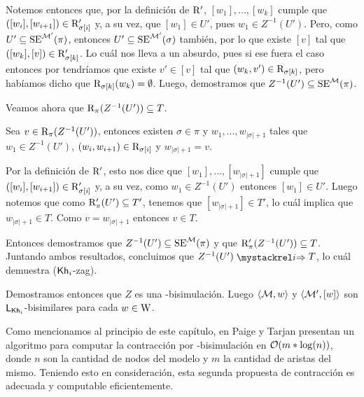 \begin{demostracion}
\begin{itemize}
        Notemos entonces que, por la definición de $\mathrm{R}'$, $[w_1],...,[w_k]$ cumple que $([w_i],[w_{i+1}]) \in \mathrm{R}'_{\sigma[i]}$ y, a su vez, 
        que $[w_1] \in U'$, pues $w_1 \in Z^{-1}(U')$. Pero, como $U'\subseteq\mathrm{SE}^{\mathcal{M}'}(\pi)$, entonces $U'\subseteq\mathrm{SE}^{\mathcal{M}'}(\sigma)$ 
        también, por lo que existe $[v]$ tal que $([w_k],[v]) \in \mathrm{R}'_{\sigma[k]}$. 
        Lo cuál nos lleva a un absurdo, pues si ese fuera el caso entonces por  tendríamos que existe 
        $v' \in [v]$ tal que $(w_k,v') \in \mathrm{R}_{\sigma[k]}$, pero habíamos dicho que $\mathrm{R}_{\sigma[k]}(w_k) = \emptyset$.
        Luego, demostramos que $Z^{-1}(U')\subseteq\mathrm{SE}^{\mathcal{M}}(\pi)$.

        Veamos ahora que $\mathrm{R}_\pi(Z^{-1}(U')) \subseteq T$.

        Sea $v \in \mathrm{R}_\pi(Z^{-1}(U'))$, entonces existen $\sigma \in \pi$ y $w_1,...,w_{|\sigma|+1}$ tales que 
        $w_1 \in Z^{-1}(U')$, $(w_i,w_{i+1}) \in \mathrm{R}_{\sigma[i]}$ y $w_{|\sigma|+1} = v$. 

        Por la definición de $\mathrm{R}'$, esto nos dice que $[w_1],...,[w_{|\sigma|+1}]$ cumple que $([w_i],[w_{i+1}]) \in \mathrm{R}'_{\sigma[i]}$ 
        y, a su vez, como $w_1 \in Z^{-1}(U')$ entonces $[w_1] \in U'$. Luego notemos que como $\mathrm{R}'_\pi(U') \subseteq T'$, tenemos que 
        $[w_{|\sigma|+1}] \in T'$, lo cuál implica que $w_{|\sigma|+1} \in T$. Como $v = w_{|\sigma|+1}$ entonces $v \in T$. 

        Entonces demostramos que $Z^{-1}(U')\subseteq\mathrm{SE}^{\mathcal{M}}(\pi)$ y que $\mathrm{R}'_\pi(Z^{-1}(U')) \subseteq T$. 
        Juntando ambos resultados, concluimos que $Z^{-1}(U') \ultsExecAgi T$, lo cuál demuestra ($\mathsf{Kh}_i$-zag).
    \end{itemize}
    Demostramos entonces que $Z$ es una \KHilogic-bisimulación. Luego $\langle \mathcal{M},w \rangle$ y $\langle \mathcal{M}',[w] \rangle$ son $\mathsf{L}_{\mathsf{Kh}_i}$-bisimilares 
    para cada $w \in \mathrm{W}$.
\end{demostracion}

Como mencionamos al principio de este capítulo, en \cite{Paige&TarjanContraction} 
Paige y Tarjan presentan un algoritmo para computar la contracción por \bml-bisimulación en $\mathcal{O}(m*\log(n))$, donde $n$ son la cantidad 
de nodos del modelo y $m$ la cantidad de aristas del mismo. Teniendo esto en 
consideración, esta segunda propuesta de contracción es adecuada y computable eficientemente.


